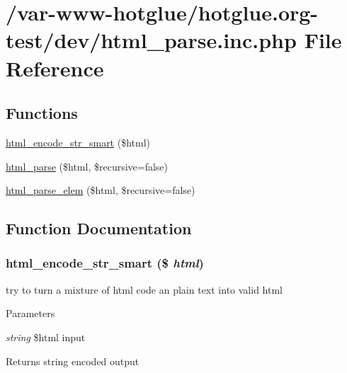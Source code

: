 \hypertarget{html__parse_8inc_8php}{
\section{/var-\/www-\/hotglue/hotglue.org-\/test/dev/html\_\-parse.inc.php File Reference}
\label{html__parse_8inc_8php}
}
\subsection*{Functions}
\begin{DoxyCompactItemize}
\item 
\hyperlink{html__parse_8inc_8php_a7eda4037f4b2576b3bcd97408ff95bd5}{html\_\-encode\_\-str\_\-smart} (\$html)
\item 
\hyperlink{html__parse_8inc_8php_a1003b146f08aef5a3a78d75a3538a4d7}{html\_\-parse} (\$html, \$recursive=false)
\item 
\hyperlink{html__parse_8inc_8php_a6d9c21ee610953fb5b5b64fae3f74ed3}{html\_\-parse\_\-elem} (\$html, \$recursive=false)
\end{DoxyCompactItemize}


\subsection{Function Documentation}
\hypertarget{html__parse_8inc_8php_a7eda4037f4b2576b3bcd97408ff95bd5}{
\subsubsection[{html\_\-encode\_\-str\_\-smart}]{\setlength{\rightskip}{0pt plus 5cm}html\_\-encode\_\-str\_\-smart (\$ {\em html})}}
\label{html__parse_8inc_8php_a7eda4037f4b2576b3bcd97408ff95bd5}
try to turn a mixture of html code an plain text into valid html


\begin{DoxyParams}{Parameters}
\item[{\em string}]\$html input \end{DoxyParams}
\begin{DoxyReturn}{Returns}
string encoded output 
\end{DoxyReturn}


